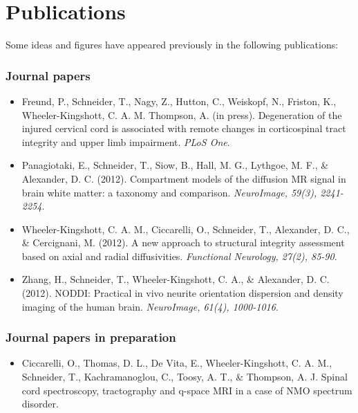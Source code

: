 

\chapter*{Publications} %

Some ideas and figures have appeared previously in the following publications:

\bigskip
\subsection*{Journal papers}
\begin{itemize}
\item Freund, P., Schneider, T., Nagy, Z., Hutton, C., Weiskopf, N., Friston, K., Wheeler-Kingshott, C. A. M. Thompson, A. (in press). Degeneration of the injured cervical cord is associated with remote changes in
corticospinal tract integrity and upper limb impairment. \emph{PLoS One}.
\item Panagiotaki, E., Schneider, T., Siow, B., Hall, M. G., Lythgoe, M. F., \& Alexander, D. C. (2012). Compartment models of the diffusion MR signal in brain white matter: a taxonomy and comparison. \emph{NeuroImage, 59(3), 2241-2254}. 
\item Wheeler-Kingshott, C. A. M., Ciccarelli, O., Schneider, T., Alexander, D. C., \& Cercignani, M. (2012). A new approach to structural integrity assessment based on axial and radial diffusivities. \emph{Functional Neurology, 27(2), 85-90}.
\item Zhang, H., Schneider, T., Wheeler-Kingshott, C. A., \& Alexander, D. C. (2012). NODDI: Practical in vivo neurite orientation dispersion and density imaging of the human brain. \emph{NeuroImage, 61(4), 1000-1016}.
\end{itemize}
	
\subsection*{Journal papers in preparation}
\begin{itemize}
 \item Ciccarelli, O., Thomas, D. L., De Vita, E., Wheeler-Kingshott, C. A. M., Schneider, T., Kachramanoglou, C., Toosy, A. T., \& Thompson, A. J. Spinal cord spectroscopy, tractography and q-space MRI in a case of NMO spectrum disorder.
\end{itemize}
